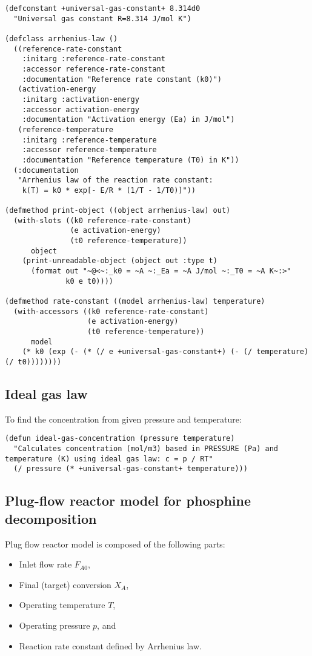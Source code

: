 \documentclass[listings, a4paper, fleqn, pdftex, 12pt, openany, oneside, final]{memoir}
\theoremstyle{definition}
\begin{document}
\begin{verbatim}
(defconstant +universal-gas-constant+ 8.314d0
  "Universal gas constant R=8.314 J/mol K")

(defclass arrhenius-law ()
  ((reference-rate-constant
    :initarg :reference-rate-constant
    :accessor reference-rate-constant
    :documentation "Reference rate constant (k0)")
   (activation-energy
    :initarg :activation-energy
    :accessor activation-energy
    :documentation "Activation energy (Ea) in J/mol")
   (reference-temperature
    :initarg :reference-temperature
    :accessor reference-temperature
    :documentation "Reference temperature (T0) in K"))
  (:documentation
   "Arrhenius law of the reaction rate constant:
    k(T) = k0 * exp[- E/R * (1/T - 1/T0)]"))

(defmethod print-object ((object arrhenius-law) out)
  (with-slots ((k0 reference-rate-constant)
               (e activation-energy)
               (t0 reference-temperature))
      object
    (print-unreadable-object (object out :type t)
      (format out "~@<~:_k0 = ~A ~:_Ea = ~A J/mol ~:_T0 = ~A K~:>"
              k0 e t0))))

(defmethod rate-constant ((model arrhenius-law) temperature)
  (with-accessors ((k0 reference-rate-constant)
                   (e activation-energy)
                   (t0 reference-temperature))
      model
    (* k0 (exp (- (* (/ e +universal-gas-constant+) (- (/ temperature) (/ t0))))))))
\end{verbatim}

\subsection{Ideal gas law}
\label{sec:orgheadline3}
To find the concentration from given pressure and temperature:

\begin{verbatim}
(defun ideal-gas-concentration (pressure temperature)
  "Calculates concentration (mol/m3) based in PRESSURE (Pa) and
temperature (K) using ideal gas law: c = p / RT"
  (/ pressure (* +universal-gas-constant+ temperature)))
\end{verbatim}

\subsection{Plug-flow reactor model for phosphine decomposition}
\label{sec:orgheadline4}
Plug flow reactor model is composed of the following parts:
\begin{itemize}
\item Inlet flow rate \(F_{A0}\),
\item Final (target) conversion \(X_{A}\),
\item Operating temperature \(T\),
\item Operating pressure \(p\), and
\item Reaction rate constant defined by Arrhenius law.
\end{itemize}
\end{document}
